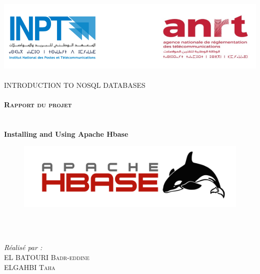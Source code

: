 \begin{titlepage}
\begin{center}

\includegraphics[width=1\textwidth]{./INPT+ANRT}~\\[1.5cm]

\textsc{\Large INTRODUCTION TO NOSQL DATABASES }\\[1.5cm]

\textsc{\Large }\\[0.4cm]

\textsc{\LARGE \textbf{Rapport du projet}}\\[0.5cm]



\HRule \\[1cm]



{\huge \bfseries \\ Installing and Using Apache Hbase \\ }
\begin{figure}[!htb] 
\begin{center} 
\includegraphics[width=.8\linewidth]{HBase} 
\end{center} 
\end{figure}  \FloatBarrier
\\
\HRule \\[1.5cm]
\vspace{1.2cm}

\begin{minipage}{0.4\textwidth}
\begin{flushleft} \large
\emph{Réalisé par :}\\[0.5 cm]
EL BATOURI  \textsc{ Badr-eddine}\\
ELGAHBI  \textsc{ Taha}\\


\end{flushleft}
\end{minipage}
\end{center}
\end{titlepage}
